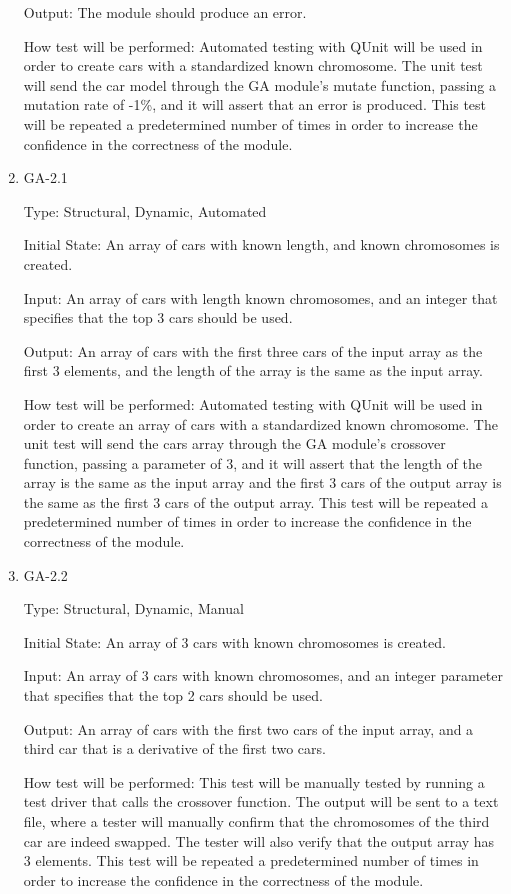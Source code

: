 \documentclass[12pt, titlepage]{article}
\begin{document}
\begin{enumerate}
Output: The module should produce an error.
					
How test will be performed: Automated testing with QUnit will be used in order to create cars with a standardized known chromosome. The unit test will send the car model through the GA module's mutate function, passing a mutation rate of -1\%, and it will assert that an error is produced. This test will be repeated  a predetermined number of times in order to increase the confidence in the correctness of the module.

\item{GA-2.1\\}

Type: Structural, Dynamic, Automated
					
Initial State: An array of cars with known length, and known chromosomes is created.
					
Input: An array of cars with length known chromosomes, and an integer that specifies that the top 3 cars should be used.
					
Output: An array of cars with the first three cars of the input array as the first 3 elements, and the length of the array is the same as the input array.
					
How test will be performed: Automated testing with QUnit will be used in order to create an array of cars with a standardized known chromosome. The unit test will send the cars array through the GA module's crossover function, passing a parameter of 3, and it will assert that the length of the array is the same as the input array and the first 3 cars of the output array is the same as the first 3 cars of the output array. This test will be repeated  a predetermined number of times in order to increase the confidence in the correctness of the module.

\item{GA-2.2\\}

Type: Structural, Dynamic, Manual
					
Initial State: An array of 3 cars with known chromosomes is created.
					
Input: An array of 3 cars with known chromosomes, and an integer parameter that specifies that the top 2 cars should be used.
					
Output: An array of cars with the first two cars of the input array, and a third car that is a derivative of the first two cars.
					
How test will be performed: This test will be manually tested by running a test driver that calls the crossover function. The output will be sent to a text file, where a tester will manually confirm that the chromosomes of the third car are indeed swapped. The tester will also verify that the output array has 3 elements. This test will be repeated a predetermined number of times in order to increase the confidence in the correctness of the module.


\end{enumerate}
\end{document}
